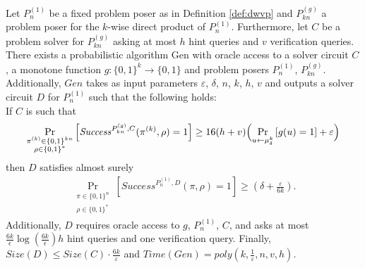 \begin{theorem}
\label{th:sec_amp_for_dwvp}
Let $P_{n}^{(1)}$ be a fixed problem poser as in Definition \ref{def:dwvp}
and $P_{kn}^{(g)}$ a problem poser for the $k$-wise direct product of $P_{n}^{(1)}$.
Furthermore, let $C$ be a problem solver for $P_{kn}^{(g)}$ asking at most $h$ hint queries and $v$ verification queries.
There exists a probabilistic algorithm Gen with oracle access to a solver circuit $C$,
a monotone function $g:\{0,1\}^k \rightarrow \{0,1\}$ and problem posers $P_{n}^{(1)}$, $P_{kn}^{(g)}$.
Additionally, $\mathit{Gen}$ takes as input parameters $\varepsilon$, $\delta$, $n$, $k$, $h$, $v$ and outputs a solver circuit $D$ for $P_{n}^{(1)}$
such that the following holds: \\
If $C$ is such that
  \begin{align*}
    \underset{\substack{\pi^{(k)} \in \{0,1\}^{kn} \\ \rho \in \{0,1\}^{*}}}{\Pr}\left[\mathit{Success}^{P_{kn}^{(g)}, C}(\pi^{(k)}, \rho) = 1\right]
    \geq 16(h+v)\Bigl(\underset{u \leftarrow \mu_\delta^k}{\Pr}\left[g(u) = 1\right] + \varepsilon\Bigr)
  \end{align*}
then $D$ satisfies almost surely
  \begin{align*}
    \underset{\substack{\pi \in \{0,1\}^{n} \\ \rho \in \{0,1\}^{*}}}
    {\Pr}\left[\mathit{Success}^{P_{n}^{(1)},D}(\pi, \rho) = 1\right] \geq (\delta + \frac{\varepsilon}{6k}).
  \end{align*}
Additionally, $D$ requires oracle access to $g$, $P_{n}^{(1)}$, $C$,
and asks at most $\frac{6k}{\epsilon}\log\left(\frac{6k}{\epsilon}\right) h$ hint queries and one verification query.
Finally, $\mathit{Size}(D) \leq \mathit{Size}(C) \cdot \frac{6k}{\varepsilon}$ and $\mathit{Time}(\mathit{Gen}) = \mathit{poly}(k, \frac{1}{\varepsilon}, n, v, h)$.
\end{theorem}
%


